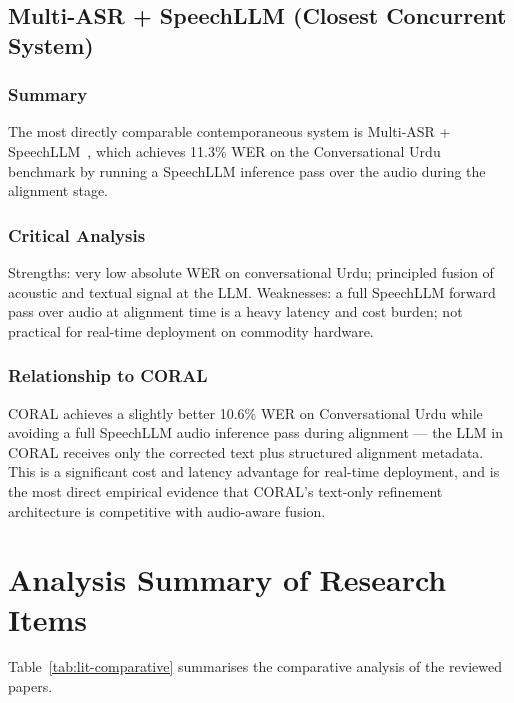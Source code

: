 \subsection{Multi-ASR + SpeechLLM (Closest Concurrent System)}
\label{ssec:lit-speechllm}

\subsubsection{Summary}
The most directly comparable contemporaneous system is Multi-ASR + SpeechLLM~\cite{anon2025speechllm}, which achieves 11.3\% WER on the Conversational Urdu benchmark by running a SpeechLLM inference pass over the audio during the alignment stage.

\subsubsection{Critical Analysis}
Strengths: very low absolute WER on conversational Urdu; principled fusion of acoustic and textual signal at the LLM. Weaknesses: a full SpeechLLM forward pass over audio at alignment time is a heavy latency and cost burden; not practical for real-time deployment on commodity hardware.

\subsubsection{Relationship to CORAL}
CORAL achieves a slightly better 10.6\% WER on Conversational Urdu while avoiding a full SpeechLLM audio inference pass during alignment --- the LLM in CORAL receives only the corrected text plus structured alignment metadata. This is a significant cost and latency advantage for real-time deployment, and is the most direct empirical evidence that CORAL's text-only refinement architecture is competitive with audio-aware fusion.

\section{Analysis Summary of Research Items}
\label{sec:lit-summary-table}

Table~\ref{tab:lit-comparative} summarises the comparative analysis of the reviewed papers.

